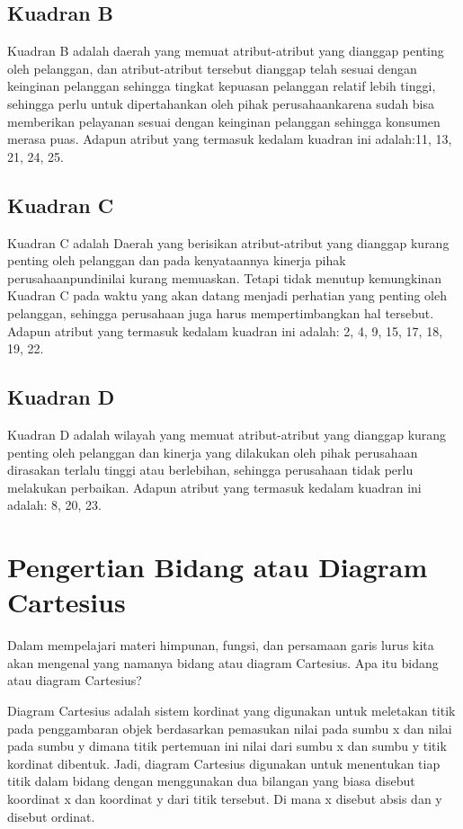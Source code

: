 \subsection{Kuadran B}
Kuadran B adalah daerah yang memuat atribut-atribut yang dianggap penting oleh pelanggan, dan atribut-atribut tersebut dianggap telah sesuai dengan keinginan
pelanggan sehingga tingkat kepuasan pelanggan relatif lebih tinggi, sehingga perlu untuk dipertahankan oleh pihak perusahaankarena sudah bisa memberikan pelayanan
sesuai dengan keinginan pelanggan sehingga konsumen merasa puas. Adapun atribut yang termasuk kedalam kuadran ini adalah:11, 13, 21, 24, 25.
\subsection{Kuadran C}
Kuadran C adalah Daerah yang berisikan atribut-atribut yang dianggap kurang penting oleh pelanggan dan pada kenyataannya kinerja pihak perusahaanpundinilai kurang memuaskan. Tetapi tidak
menutup kemungkinan Kuadran C pada waktu yang akan datang menjadi perhatian yang penting oleh pelanggan, sehingga perusahaan juga harus mempertimbangkan
hal tersebut. Adapun atribut yang termasuk kedalam kuadran ini adalah: 2, 4, 9, 15, 17, 18, 19, 22.
\subsection{Kuadran D}
Kuadran D adalah wilayah yang memuat atribut-atribut yang dianggap kurang penting oleh pelanggan dan kinerja yang dilakukan oleh pihak perusahaan dirasakan
terlalu tinggi atau berlebihan, sehingga perusahaan tidak perlu melakukan perbaikan. Adapun atribut yang termasuk kedalam kuadran ini adalah: 8, 20, 23.

\section{Pengertian Bidang atau Diagram Cartesius}

Dalam mempelajari materi himpunan, fungsi, dan persamaan garis lurus kita akan mengenal yang namanya bidang atau diagram Cartesius. Apa itu bidang atau diagram Cartesius?

Diagram Cartesius adalah sistem kordinat yang digunakan untuk meletakan titik pada penggambaran objek berdasarkan pemasukan nilai pada sumbu x dan nilai pada sumbu y dimana titik pertemuan ini nilai dari sumbu x dan sumbu y titik kordinat dibentuk. Jadi, diagram Cartesius digunakan untuk menentukan tiap titik dalam bidang dengan menggunakan dua bilangan yang biasa disebut koordinat x dan koordinat y dari titik tersebut. Di mana x disebut absis dan y disebut ordinat.

